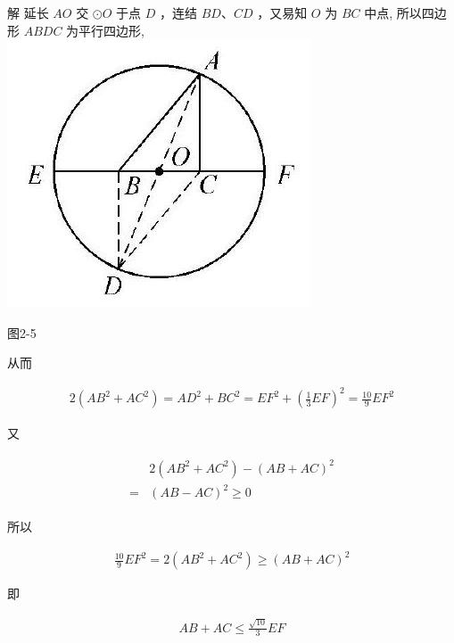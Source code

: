 \documentclass[10pt]{article}
\begin{document}
解 延长 $A O$ 交 $\odot O$ 于点 $D$ ，连结 $B D 、 C D$ ，又易知 $O$ 为 $B C$ 中点, 所以四边形 $A B D C$ 为平行四边形,\\
\includegraphics[max width=\textwidth, center]{2024_10_30_66b8e5e701da2093c133g-019}

图2-5

从而

\begin{align*}
2\left(A B^{2}+A C^{2}\right)=A D^{2}+B C^{2}=E F^{2}+\left(\frac{1}{3} E F\right)^{2}=\frac{10}{9} E F^{2}
\end{align*}

又

\begin{align*}
\begin{aligned}
& 2\left(A B^{2}+A C^{2}\right)-(A B+A C)^{2} \\
= & (A B-A C)^{2} \geqslant 0
\end{aligned}
\end{align*}

所以

\begin{align*}
\frac{10}{9} E F^{2}=2\left(A B^{2}+A C^{2}\right) \geqslant(A B+A C)^{2}
\end{align*}

即

\begin{align*}
A B+A C \leqslant \frac{\sqrt{10}}{3} E F
\end{align*}
\end{document}
